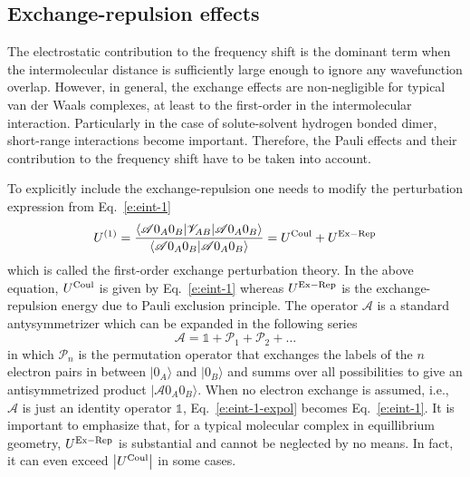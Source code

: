 \documentclass[a4paper,titlepage,twoside,fleqn,12pt]{book}
\begin{document}
\begin{refsection}
\subsection{Exchange-repulsion effects}

The electrostatic contribution to the frequency shift is the dominant term 
when the intermolecular distance is sufficiently large enough to ignore 
any wavefunction overlap. However, in general, the exchange effects
are non\hyp{}negligible for typical van der Waals complexes, at least to the first\hyp{}order
in the intermolecular interaction. Particularly 
in the case of solute\hyp{}solvent hydrogen bonded dimer, 
short\hyp{}range interactions become important. 
Therefore, the Pauli effects and their contribution to the frequency shift have to be taken into account.

To explicitly include the exchange\hyp{}repulsion one needs to
modify the perturbation expression from Eq.~\eqref{e:eint-1}
%
\begin{equation} \label{e:eint-1-expol}
U^{(1)} = 
\frac{
\langle \mathscr{A} 0_A0_B \lvert \mathscr{V}_{AB} \rvert \mathscr{A} 0_A0_B \rangle 
}{
\langle \mathscr{A} 0_A0_B \vert \mathscr{A} 0_A0_B \rangle 
}
= U^{\rm Coul} + U^{\rm Ex-Rep}
\end{equation}
%
which is called the first\hyp{}order exchange perturbation theory.
In the above equation, $U^{\rm Coul}$ is given by Eq.~\eqref{e:eint-1}
whereas $U^{\rm Ex-Rep}$ is the exchange\hyp{}repulsion
energy due to Pauli exclusion principle.
The operator $\mathscr{A}$ is a standard antysymmetrizer which
can be expanded in the following series
%
\begin{equation} \label{e:antisymmetrizer-series}
 \mathscr{A} = \mathbb{1} + \mathscr{P}_1 + \mathscr{P}_2 + \ldots
\end{equation}
%
in which $\mathscr{P}_n$ is the permutation operator that exchanges the labels 
of the $n$ electron pairs in between $\vert 0_A \rangle$ and $\vert 0_B \rangle$
and summs over all possibilities to give an antisymmetrized product
$\vert \mathscr{A} 0_A0_B \rangle $. When no electron exchange is
assumed, i.e., $\mathscr{A}$ is just an identity operator $\mathbb{1}$, 
Eq.~\eqref{e:eint-1-expol} becomes Eq.~\eqref{e:eint-1}. It is important to emphasize that, for 
a typical molecular complex in equillibrium geometry, $U^{\rm Ex-Rep}$
is substantial and cannot be neglected by no means. In fact, it can even 
exceed $\left|U^{\rm Coul}\right|$ in some cases.


\end{refsection}
\end{document}
